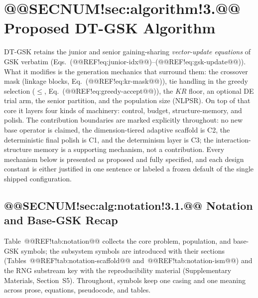 \documentclass[10pt,a4paper]{article}
\newcommand{\dtgsk}{DT-GSK}
\begin{document}
\section{@@SECNUM!sec:algorithm!3.@@ Proposed \dtgsk{} Algorithm}\label{sec:algorithm}


\dtgsk{} retains the junior and senior gaining-sharing \emph{vector-update
equations} of GSK verbatim (Eqs.~(@@REF!eq:junior-idx@@)--(@@REF!eq:gsk-update@@)).
What it modifies is the generation mechanics that surround them: the crossover
mask (linkage blocks, Eq.~(@@REF!eq:kr-mask@@)), tie handling in the greedy
selection ($\le$, Eq.~(@@REF!eq:greedy-accept@@)), the $KR$ floor, an optional
DE trial arm, the senior partition, and the population size (NLPSR). On top of
that core it layers four kinds of machinery: control, budget, structure-memory,
and polish. 
The contribution boundaries are marked explicitly throughout: no new base
operator is claimed, the dimension-tiered adaptive scaffold is C2, the
deterministic final polish is C1, and the determinism layer is C3; the
interaction-structure memory is a supporting mechanism, not a contribution.
Every mechanism below is presented as proposed and fully specified, and
each design constant is either justified in one sentence or labeled a
frozen default of the single shipped configuration.


\subsection{@@SECNUM!sec:alg:notation!3.1.@@ Notation and Base-GSK Recap}\label{sec:alg:notation}


Table~@@REF!tab:notation@@ collects the core problem, population, and base-GSK
symbols; the subsystem symbols are introduced with their sections
(Tables~@@REF!tab:notation-scaffold@@ and~@@REF!tab:notation-ism@@) and the RNG
substream key with the reproducibility material (Supplementary Materials, Section~S5). Throughout,
symbols keep one casing and one meaning across prose, equations, pseudocode,
and tables.
\end{document}
